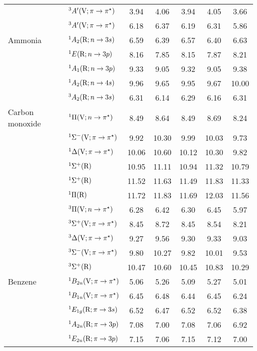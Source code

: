 \begin{tabular}{p{3.5cm}p{3.3cm}c|cccc}
        &$^3A^\prime (\mathrm{V}; \pi \rightarrow \pi^\star)$					& 3.94	&4.06	&3.94	&4.05	&3.66\\
        &$^3A^\prime (\mathrm{V}; \pi \rightarrow \pi^\star)$					& 6.18	&6.37	&6.19	&6.31	&5.86\\
  Ammonia		&$^1A_2 (\mathrm{R};n \rightarrow 3s)$ 					&6.59	&6.39	&6.57	&6.40	&6.63	 \\
        &$^1E (\mathrm{R};n \rightarrow 3p)$ 					&8.16	&7.85	&8.15	&7.87	&8.21 	\\
        &$^1A_1 (\mathrm{R};n \rightarrow 3p)$ 					&9.33	&9.05	&9.32	&9.05	&9.38 	\\
        &$^1A_2 (\mathrm{R};n \rightarrow 4s)$ 					&9.96	&9.65	&9.95	&9.67	&10.00	 \\
        &$^3A_2 (\mathrm{R};n \rightarrow 3s)$ 					&6.31	&6.14	&6.29	&6.16	&6.31 	\\
  Carbon monoxide	&$^1\Pi (\mathrm{V};n \rightarrow \pi^\star)$ 				& 8.49	&8.64	&8.49	&8.69	&8.24	 \\
        &$^1\Sigma^- (\mathrm{V};\pi \rightarrow \pi^\star)$				& 9.92	&10.30	&9.99	&10.03	&9.73	\\
        &$^1\Delta (\mathrm{V};\pi \rightarrow \pi^\star)$ 				&10.06	&10.60	&10.12	&10.30	&9.82	\\
        &$^1\Sigma^+ (\mathrm{R})$ 					&10.95	&11.11	&10.94	&11.32	&10.79	\\
        &$^1\Sigma^+ (\mathrm{R})$ 					&11.52	&11.63	&11.49	&11.83	&11.33	\\
        &$^1\Pi (\mathrm{R})$							&11.72	&11.83	&11.69	&12.03	&11.56	\\
        &$^3\Pi (\mathrm{V};n \rightarrow \pi^\star)$ 					& 6.28	&6.42	&6.30	&6.45	&5.97	\\
        &$^3\Sigma^+ (\mathrm{V};\pi \rightarrow \pi^\star)$			& 8.45	&8.72	&8.45	&8.54	&8.21	\\
        &$^3\Delta (\mathrm{V};\pi \rightarrow \pi^\star)$ 				& 9.27	&9.56	&9.30	&9.33	&9.03	\\
        &$^3\Sigma^- (\mathrm{V};\pi \rightarrow \pi^\star)$				& 9.80	&10.27	&9.82	&10.01	&9.53	\\
        &$^3\Sigma^+ (\mathrm{R})$ 					& 10.47	&10.60	&10.45	&10.83	&10.29	\\
  Benzene		&$^1B_{2u} (\mathrm{V}; \pi \rightarrow \pi^\star)$				& 5.06	&5.26	&5.09	&5.27	&5.01\\
        &$^1B_{1u} (\mathrm{V}; \pi \rightarrow \pi^\star)$				& 6.45	&6.48	&6.44	&6.45	&6.24\\
        &$^1E_{1g} (\mathrm{R}; \pi \rightarrow 3s)$				& 6.52	&6.47	&6.52	&6.52	&6.38\\
        &$^1A_{2u}  (\mathrm{R}; \pi \rightarrow 3p)$				& 7.08	&7.00	&7.08	&7.06	&6.92\\
        &$^1E_{2u}  (\mathrm{R}; \pi \rightarrow 3p)$				& 7.15	&7.06	&7.15	&7.12	&7.00\\

\end{tabular}

